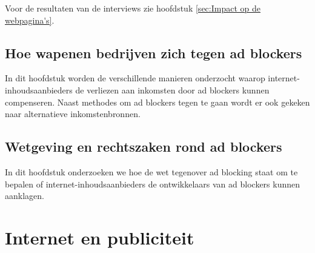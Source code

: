 \documentclass[pdftex,a4paper,12pt,twoside]{report}
\begin{document}
Voor de resultaten van de interviews zie hoofdstuk \ref{sec:Impact op de webpagina's}. 
\section{Hoe wapenen bedrijven zich tegen ad blockers}
In dit hoofdstuk worden de verschillende manieren onderzocht waarop internet-inhoudsaanbieders de verliezen aan inkomsten door ad blockers kunnen compenseren. Naast methodes om ad blockers tegen te gaan wordt er ook gekeken naar alternatieve inkomstenbronnen.  
\section{Wetgeving en rechtszaken rond ad blockers}
In dit hoofdstuk onderzoeken we hoe de wet tegenover ad blocking staat om te bepalen of internet-inhoudsaanbieders de ontwikkelaars van ad blockers kunnen aanklagen.
\chapter{Internet en publiciteit}
\label{ch:Internet en publiciteit}
\end{document}
